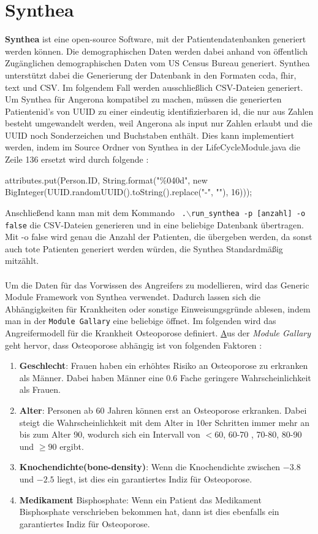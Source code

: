 \documentclass[german,version-2020-11]{uzl-thesis}
\begin{document}
\section{Synthea}
\textbf{Synthea} \cite{19,20} ist eine open-source Software, mit der Patientendatenbanken generiert werden können. Die demographischen Daten werden dabei anhand von öffentlich Zugänglichen demographischen Daten vom US Census Bureau \cite{21} generiert. Synthea unterstützt dabei die Generierung der Datenbank in den Formaten ccda, fhir, text und CSV. Im folgendem Fall werden ausschließlich CSV-Dateien generiert.\\  Um Synthea für Angerona kompatibel zu machen, müssen die generierten Patientenid's von UUID zu einer eindeutig identifizierbaren id, die nur aus Zahlen besteht umgewandelt werden, weil Angerona als input nur Zahlen erlaubt und die UUID noch Sonderzeichen und Buchstaben enthält. Dies kann implementiert werden, indem im Source Ordner von Synthea in der LifeCycleModule.java die Zeile 136 ersetzt wird durch folgende : 
\begin{Java}
    attributes.put(Person.ID, String.format("\%040d", new BigInteger(UUID.randomUUID().toString().replace("-", ""), 16)));
\end{Java}
Anschließend kann man mit dem Kommando \texttt{ .$\backslash$run\_synthea -p [anzahl] -o false} die CSV-Dateien generieren und in eine beliebige Datenbank übertragen. Mit -o false wird genau die Anzahl der Patienten, die übergeben werden, da sonst auch tote Patienten generiert werden würden, die Synthea Standardmäßig mitzählt.  \\ \\
Um die Daten für das Vorwissen des Angreifers zu modellieren, wird das Generic Module Framework von Synthea verwendet. Dadurch lassen sich die Abhängigkeiten für Krankheiten oder sonstige  Einweisungsgründe ablesen, indem man in der \texttt{Module Gallary} eine beliebige öffnet. Im folgenden  wird das Angreifermodell  für die Krankheit Osteoporose definiert.  \href{https://github.com/synthetichealth/synthea/wiki/Module-Gallery#Osteoporosis} 
Aus der \textit{Module Gallary} geht hervor, dass Osteoporose abhängig ist von folgenden Faktoren : 
\begin{enumerate}
	\item \textbf{Geschlecht}: Frauen haben ein erhöhtes Risiko an Osteoporose zu erkranken als Männer. Dabei haben Männer eine $0.6$ Fache geringere Wahrscheinlichkeit als Frauen.
	\item \textbf{Alter}: Personen ab 60 Jahren können erst an Osteoporose erkranken. Dabei steigt die Wahrscheinlichkeit mit dem Alter in 10er Schritten immer mehr an bis zum Alter 90, wodurch sich ein Intervall von $<60$, 60-70 , 70-80, 80-90 und $\geq 90$ ergibt.
	\item \textbf{Knochendichte(bone-density)}: Wenn die Knochendichte zwischen $-3.8$ und $-2.5$ liegt, ist dies ein garantiertes Indiz für Osteoporose.
	\item \textbf{Medikament} Bisphosphate: Wenn ein Patient das Medikament Bisphosphate verschrieben bekommen hat, dann ist dies ebenfalls ein garantiertes Indiz für Osteoporose.
\end{enumerate} 
\end{document}
